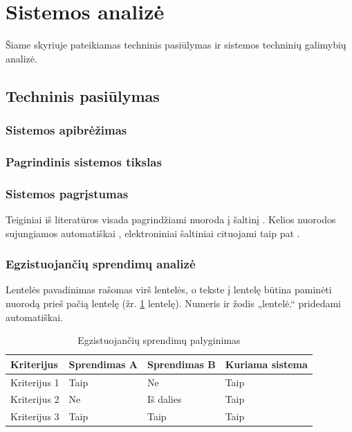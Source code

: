 \section{Sistemos analizė}

Šiame skyriuje pateikiamas techninis pasiūlymas ir sistemos techninių galimybių analizė.

\subsection{Techninis pasiūlymas}

\subsubsection{Sistemos apibrėžimas}

\lipsum[1]

\subsubsection{Pagrindinis sistemos tikslas}

\lipsum[2]

\subsubsection{Sistemos pagrįstumas}

Teiginiai iš literatūros visada pagrindžiami nuoroda į šaltinį \citep{vysniauskas2006}. Kelios nuorodos sujungiamos automatiškai \citep{masiulis2007, birziska1929, gradauskas2000}, elektroniniai šaltiniai cituojami taip pat \citep{litnet2012, valiulyte2000, ieee2009}.

\lipsum[3]

\subsubsection{Egzistuojančių sprendimų analizė}

Lentelės pavadinimas rašomas virš lentelės, o tekste į lentelę būtina paminėti nuorodą prieš pačią lentelę (žr. \ref{tab:palyginimas} lentelę). Numeris ir žodis „lentelė.“ pridedami automatiškai.

\begin{table}[!ht]
\caption{Egzistuojančių sprendimų palyginimas}
\label{tab:palyginimas}
\centering
\begin{tabular}{|p{4cm}|p{3.5cm}|p{3.5cm}|p{3.5cm}|} \toprule
\textbf{Kriterijus} & \textbf{Sprendimas A} & \textbf{Sprendimas B} & \textbf{Kuriama sistema} \\ \midrule
Kriterijus 1 & Taip & Ne & Taip \\ \hline
Kriterijus 2 & Ne & Iš dalies & Taip \\ \hline
Kriterijus 3 & Taip & Taip & Taip \\ \bottomrule
\end{tabular}
\end{table}

